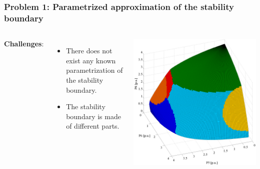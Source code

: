 \documentclass{beamer}
\begin{document}
\begin{frame}
  \frametitle{Problem 1: Parametrized approximation of the stability boundary}
  \begin{columns}
\textbf{Challenges}:
  \begin{itemize}
  \item There does not exist any known parametrization of the stability boundary.
  \item The stability boundary is made of different parts.
  \end{itemize}
\includegraphics[width=1\textwidth]{Figs/StabBoundIEEE9}
  \end{columns}
\end{frame}
\end{document}
